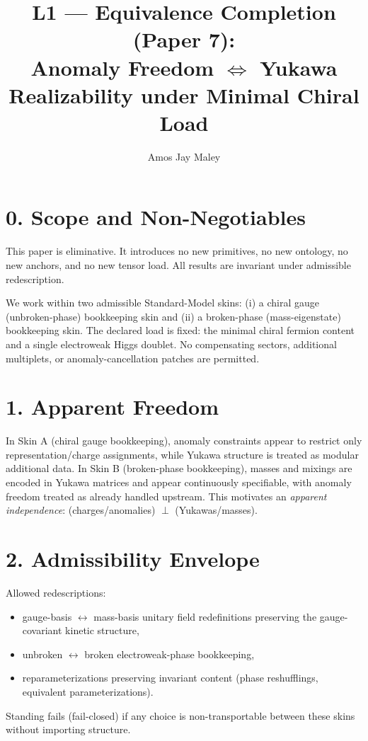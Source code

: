 ﻿\documentclass[11pt]{article}
\title{L1 --- Equivalence Completion (Paper 7):\\
Anomaly Freedom $\Longleftrightarrow$ Yukawa Realizability under Minimal Chiral Load}
\author{Amos Jay Maley}
\date{}
\begin{document}
\maketitle

\section*{0. Scope and Non-Negotiables}
This paper is eliminative. It introduces no new primitives, no new ontology, no new anchors, and no new tensor load.
All results are invariant under admissible redescription.

We work within two admissible Standard-Model skins:
(i) a chiral gauge (unbroken-phase) bookkeeping skin and
(ii) a broken-phase (mass-eigenstate) bookkeeping skin.
The declared load is fixed: the minimal chiral fermion content and a single electroweak Higgs doublet.
No compensating sectors, additional multiplets, or anomaly-cancellation patches are permitted.

\section*{1. Apparent Freedom}
In Skin A (chiral gauge bookkeeping), anomaly constraints appear to restrict only representation/charge assignments,
while Yukawa structure is treated as modular additional data.
In Skin B (broken-phase bookkeeping), masses and mixings are encoded in Yukawa matrices and appear continuously specifiable,
with anomaly freedom treated as already handled upstream.
This motivates an \emph{apparent independence}: (charges/anomalies) $\perp$ (Yukawas/masses).

\section*{2. Admissibility Envelope}
Allowed redescriptions:
\begin{itemize}
\item gauge-basis $\leftrightarrow$ mass-basis unitary field redefinitions preserving the gauge-covariant kinetic structure,
\item unbroken $\leftrightarrow$ broken electroweak-phase bookkeeping,
\item reparameterizations preserving invariant content (phase reshufflings, equivalent parameterizations).
\end{itemize}

Standing fails (fail-closed) if any choice is non-transportable between these skins without importing structure.
\end{document}
